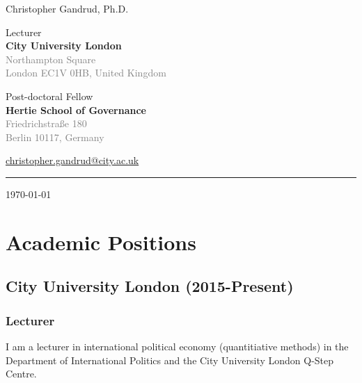 \documentclass[a4paper]{article}
\begin{document}
    \begin{flushright}
        {\huge{Christopher Gandrud, Ph.D.}} \\
        \vspace{0.25cm}

        Lecturer \\
        {\bf{\large{City University London}}} \\
        \textcolor{gray}{Northampton Square \\
        London EC1V 0HB, United Kingdom} \\
        \vspace{0.25cm}

        Post-doctoral Fellow \\
        {\bf{\large{Hertie School of Governance}}} \\
        \textcolor{gray}{Friedrichstra{\ss}e 180\\
        Berlin 10117, Germany} \\
        \vspace{0.25cm}

        \href{mailto:christopher.gandrud@city.ac.uk}{christopher.gandrud@city.ac.uk}\\[0.25cm]

        \medskip\hrule height 1pt

        \vspace{0.5cm}

        \today

    \end{flushright}



\vspace{0.5cm}

\section*{Academic Positions}

\subsection*{City University London (2015-Present)}

\subsubsection*{Lecturer}

I am a lecturer in international political economy (quantitiative methods) in the Department of International Politics and the City University London Q-Step Centre.
\end{document}
